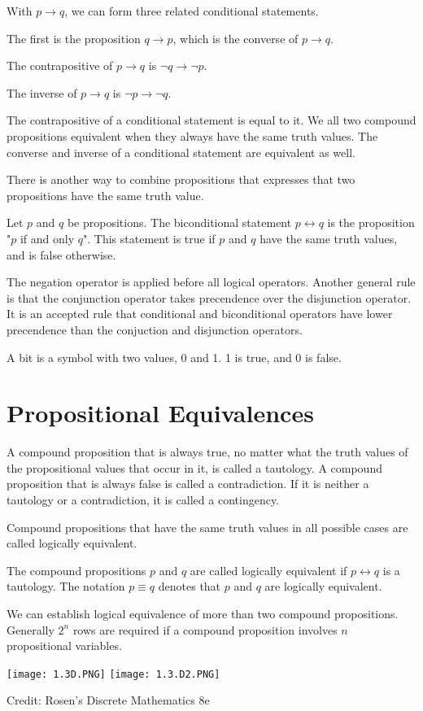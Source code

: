 \documentclass[../discrete.tex]{subfiles}
\begin{document}
With $p\rightarrow q$, we can form three related conditional statements. 

The first is the proposition $q\rightarrow p$, which is the converse of $p\rightarrow q$. 

The contrapositive of $p\rightarrow q$ is $\neg q\rightarrow \neg p$.

The inverse of $p\rightarrow q$ is $\neg p \rightarrow \neg q$.

The contrapositive of a conditional statement is equal to it. We all two compound propositions equivalent when they always have the same truth values. The converse and inverse of a conditional statement are equivalent as well.

There is another way to combine propositions that expresses that two propositions have the same truth value.
\begin{definition}
    Let $p$ and $q$ be propositions. The biconditional statement $p\leftrightarrow q$ is the proposition "$p$ if and only $q$". This statement is true if $p$ and $q$ have the same truth values, and is false otherwise.
\end{definition}
The negation operator is applied before all logical operators. Another general rule is that the conjunction operator takes precendence over the disjunction operator. It is an accepted rule that conditional and biconditional operators have lower precendence than the conjuction and disjunction operators. 

A bit is a symbol with two values, 0 and 1. 1 is true, and 0 is false. 
\section{Propositional Equivalences}
\begin{definition}
    A compound proposition that is always true, no matter what the truth values of the propositional values that occur in it, is called a tautology. A compound proposition that is always false is called a contradiction. If it is neither a tautology or a contradiction, it is called a contingency.
\end{definition}
Compound propositions that have the same truth values in all possible cases are called logically equivalent. 
\begin{definition}
    The compound propositions $p$ and $q$ are called logically equivalent if $p\leftrightarrow q$ is a tautology. The notation $p\equiv q$ denotes that $p$ and $q$ are logically equivalent.
\end{definition}
We can establish logical equivalence of more than two compound propositions. Generally $2^n$ rows are required if a compound proposition involves $n$ propositional variables.
\begin{center}
    \texttt{[image: 1.3D.PNG]}
    \texttt{[image: 1.3.D2.PNG]}

\end{center}
Credit: Rosen's Discrete Mathematics 8e
\end{document}
